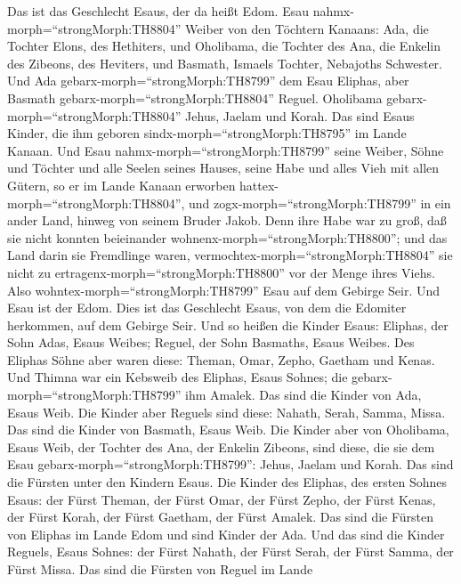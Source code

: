  Das ist das Geschlecht Esaus, der da heißt Edom.
 Esau nahmx-morph=``strongMorph:TH8804'' Weiber von den
Töchtern Kanaans: Ada, die Tochter Elons, des Hethiters, und Oholibama,
die Tochter des Ana, die Enkelin des Zibeons, des Heviters, 
und Basmath, Ismaels Tochter, Nebajoths Schwester.  Und Ada
gebarx-morph=``strongMorph:TH8799'' dem Esau Eliphas, aber Basmath
gebarx-morph=``strongMorph:TH8804'' Reguel.  Oholibama
gebarx-morph=``strongMorph:TH8804'' Jehus, Jaelam und Korah. Das sind
Esaus Kinder, die ihm geboren sindx-morph=``strongMorph:TH8795'' im
Lande Kanaan.  Und Esau nahmx-morph=``strongMorph:TH8799''
seine Weiber, Söhne und Töchter und alle Seelen seines Hauses, seine
Habe und alles Vieh mit allen Gütern, so er im Lande Kanaan erworben
hattex-morph=``strongMorph:TH8804'', und
zogx-morph=``strongMorph:TH8799'' in ein ander Land, hinweg von seinem
Bruder Jakob.  Denn ihre Habe war zu groß, daß sie nicht
konnten beieinander wohnenx-morph=``strongMorph:TH8800''; und das Land
darin sie Fremdlinge waren, vermochtex-morph=``strongMorph:TH8804'' sie
nicht zu ertragenx-morph=``strongMorph:TH8800'' vor der Menge ihres
Viehs.  Also wohntex-morph=``strongMorph:TH8799'' Esau auf
dem Gebirge Seir. Und Esau ist der Edom.  Dies ist das
Geschlecht Esaus, von dem die Edomiter herkommen, auf dem Gebirge Seir.
 Und so heißen die Kinder Esaus: Eliphas, der Sohn Adas,
Esaus Weibes; Reguel, der Sohn Basmaths, Esaus Weibes.  Des
Eliphas Söhne aber waren diese: Theman, Omar, Zepho, Gaetham und Kenas.
 Und Thimna war ein Kebsweib des Eliphas, Esaus Sohnes; die
gebarx-morph=``strongMorph:TH8799'' ihm Amalek. Das sind die Kinder von
Ada, Esaus Weib.  Die Kinder aber Reguels sind diese:
Nahath, Serah, Samma, Missa. Das sind die Kinder von Basmath, Esaus
Weib.  Die Kinder aber von Oholibama, Esaus Weib, der
Tochter des Ana, der Enkelin Zibeons, sind diese, die sie dem Esau
gebarx-morph=``strongMorph:TH8799'': Jehus, Jaelam und Korah.
 Das sind die Fürsten unter den Kindern Esaus. Die Kinder
des Eliphas, des ersten Sohnes Esaus: der Fürst Theman, der Fürst Omar,
der Fürst Zepho, der Fürst Kenas,  der Fürst Korah, der
Fürst Gaetham, der Fürst Amalek. Das sind die Fürsten von Eliphas im
Lande Edom und sind Kinder der Ada.  Und das sind die
Kinder Reguels, Esaus Sohnes: der Fürst Nahath, der Fürst Serah, der
Fürst Samma, der Fürst Missa. Das sind die Fürsten von Reguel im Lande
